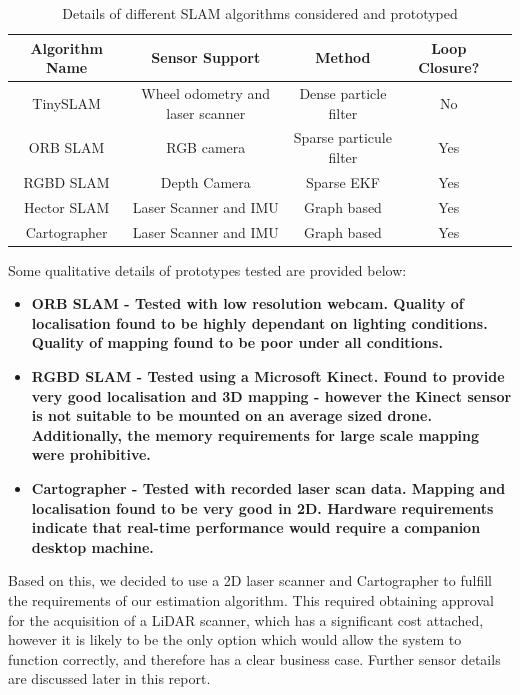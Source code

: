 \documentclass[capstone_report.tex]{subfiles}
\begin{document}
	\begin{table}[H]
		\centering
	 	\begin{tabular}{|c|c|c|c|c|}
	 		\hline
	 		\bf{Algorithm Name}	&	\bf{Sensor Support}	&	\bf{Method}	&	\bf{Loop Closure?}\\
	 		\hline
	 		TinySLAM		&	Wheel odometry and laser scanner	&	Dense particle filter &	No\\	
	 		\hline
	 		ORB SLAM 	&		RGB camera & Sparse particule filter & Yes \\
	 		\hline
	 		RGBD SLAM & Depth Camera & Sparse EKF & Yes\\
	 		\hline
	 		Hector SLAM & Laser Scanner and IMU & Graph based & Yes\\
	 		\hline
	 		Cartographer & Laser Scanner and IMU & Graph based & Yes\\
	 		\hline
	 	\end{tabular}
	 	\caption{Details of different SLAM algorithms considered and prototyped\label{tab:slamAlg}}
	\end{table}

	Some qualitative details of prototypes tested are provided below:
	\begin{itemize}
		\item \bf{ORB SLAM} \normalfont- Tested with low resolution webcam. Quality of localisation found to be highly dependant on lighting conditions. Quality of mapping found to be poor under all conditions.
	 	\item \bf{RGBD SLAM} \normalfont- Tested using a Microsoft Kinect. Found to provide very good localisation and 3D mapping - however the Kinect sensor is not suitable to be mounted on an average sized drone. Additionally, the memory requirements for large scale mapping were prohibitive.
	 	\item \bf{Cartographer} \normalfont- Tested with recorded laser scan data. Mapping and localisation found to be very good in 2D. Hardware requirements indicate that real-time performance would require a companion desktop machine.
	\end{itemize}

	Based on this, we decided to use a 2D laser scanner and Cartographer to fulfill the requirements of our estimation algorithm. This required obtaining approval for the acquisition of a LiDAR scanner, which has a significant cost attached, however it is likely to be the only option which would allow the system to function correctly, and therefore has a clear business case. Further sensor details are discussed later in this report.\\
\end{document}
